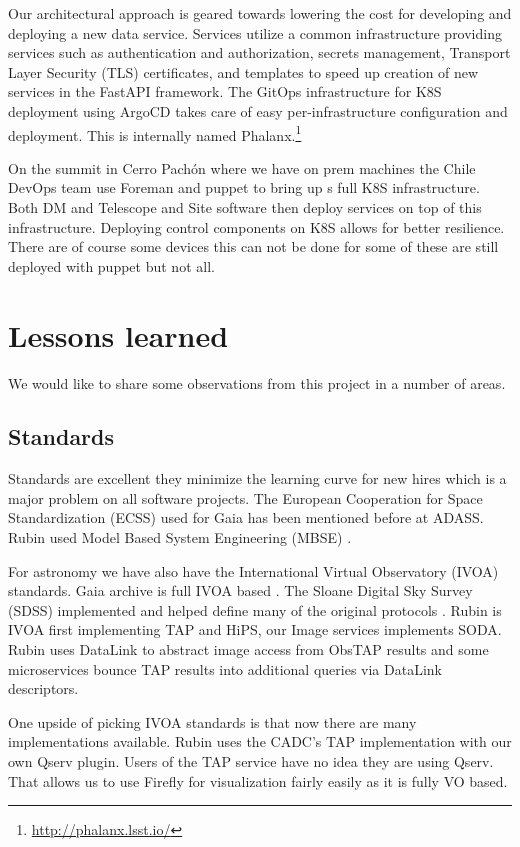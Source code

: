 \documentclass[11pt,twoside]{article}
\begin{document}
Our architectural approach is geared towards lowering the cost for developing and deploying a new data service.
Services utilize a common infrastructure providing services such as authentication and authorization, secrets management, Transport Layer Security (TLS) certificates, and templates to speed up creation of new services in the FastAPI framework.
The GitOps infrastructure for K8S deployment using ArgoCD takes care of easy per-infrastructure configuration and deployment.
This is internally named Phalanx.\footnote{\url{http://phalanx.lsst.io/}}

On the summit in Cerro Pachón where we have on prem machines the Chile DevOps team use Foreman and puppet to bring up s full K8S infrastructure.
Both DM and Telescope and Site software then deploy services on top of this infrastructure.
Deploying control components on K8S allows for better resilience.
There are of course some devices this can not be done for some of these are still deployed with puppet but not all.


\section{Lessons learned}
We would like to share some observations from this project in a number of areas.
\subsection{Standards}
Standards are excellent they minimize the learning curve for new hires which is a major problem on all software projects.
The European Cooperation for Space Standardization (ECSS) used for Gaia has been mentioned before \citep{2007arXiv0712.0249O} at ADASS.
 Rubin used Model Based System Engineering (MBSE) \citep{2018SPIE10705E..0US}.

For astronomy we have also have the International Virtual Observatory (IVOA) standards. Gaia archive is full IVOA based \citep{2019ASPC..523..445S,2015scop.confE...8G}. The Sloane Digital Sky Survey (SDSS) implemented and helped define many of the original protocols \citep{2004AAS...20511301T}.
Rubin is IVOA first implementing TAP and  HiPS,
our Image services implements SODA.
Rubin uses DataLink to abstract image access from ObsTAP results and
some microservices  bounce TAP results into additional queries via DataLink descriptors.

One upside of picking IVOA standards is that now there are many implementations available.
Rubin uses the CADC's TAP implementation  with our own Qserv plugin.
Users of the TAP service have no idea they are using Qserv.
That allows us to use Firefly for visualization fairly easily as it is
fully VO based.
\end{document}
